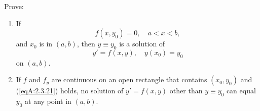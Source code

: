 \documentclass{ximera}
\begin{document}
\begin{problem}\label{exer:2.3.21}
Prove:
\begin{enumerate}
\item %
If
\begin{equation}\label{eqA:2.3.21}
f(x,y_0) = 0,\quad a<x<b,
\end{equation}
and  $x_0$ is in  $(a,b)$,
then $y\equiv y_0$ is a solution of
$$
y'=f(x,y), \quad y(x_0)=y_0
$$
on $(a,b)$.
\item %
If $f$ and $f_y$ are continuous on an open rectangle
that contains $(x_0,y_0)$ and (\ref{eqA:2.3.21}) holds, no
solution of $y'=f(x,y)$ other than $y\equiv y_0$ can equal $y_0$ at
any point in $(a,b)$.
\end{enumerate}
\end{problem}
\end{document}
